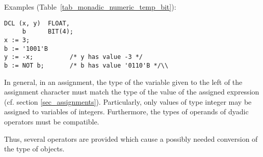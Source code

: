 Examples (Table~\ref{tab_monadic_numeric_temp_bit}):

\begin{lstlisting}
DCL (x, y)  FLOAT,  
     b      BIT(4);
x := 3;           
b := '1001'B     
y := -x;          /* y has value -3 */
b := NOT b;       /* b has value '0110'B */\\
\end{lstlisting}

In general, in an assignment, the type of the variable given to the left
of the assignment character must match the type of the value of the
assigned expression (cf. section \ref{sec_assignments}).
 Particularly, only values of type
integer may be assigned to variables of integers. Furthermore, the types
of operands of dyadic operators must be compatible.

Thus, several operators are provided which cause a possibly needed
conversion of the type of objects.

